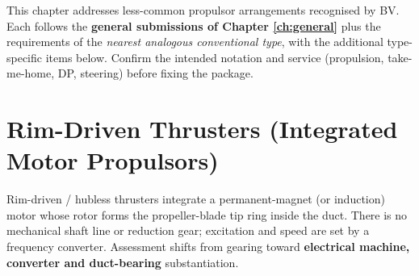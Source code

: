 \documentclass[11pt,a4paper]{report}
\begin{document}
This chapter addresses less-common propulsor arrangements recognised by BV. Each
follows the \textbf{general submissions of Chapter \ref{ch:general}} plus the
requirements of the \emph{nearest analogous conventional type}, with the
additional type-specific items below. Confirm the intended notation and service
(propulsion, take-me-home, DP, steering) before fixing the package.

\section{Rim-Driven Thrusters (Integrated Motor Propulsors)}

Rim-driven / hubless thrusters integrate a permanent-magnet (or induction) motor
whose rotor forms the propeller-blade tip ring inside the duct. There is no
mechanical shaft line or reduction gear; excitation and speed are set by a
frequency converter. Assessment shifts from gearing toward
\textbf{electrical machine, converter and duct-bearing} substantiation.
\end{document}

